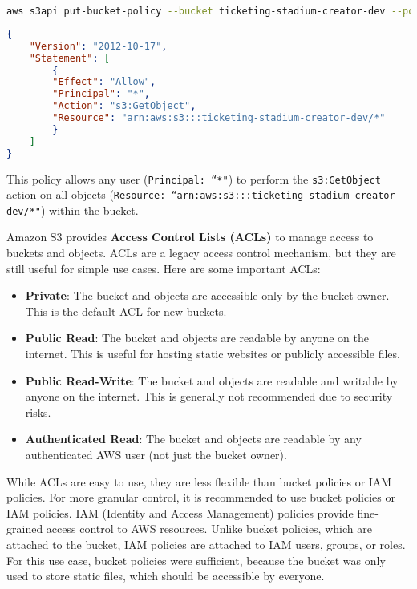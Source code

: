 \begin{lstlisting}[language=bash, caption={AWS CLI command to set a bucket policy}, label={lst:aws-cli-bucket-policy}]
aws s3api put-bucket-policy --bucket ticketing-stadium-creator-dev --policy file://bucket-policy.json
\end{lstlisting}

\begin{lstlisting}[language=json,caption=Bucket policy JSON configuration, label=lst:bucket-policy]
{
    "Version": "2012-10-17",
    "Statement": [
        {
        "Effect": "Allow",
        "Principal": "*",
        "Action": "s3:GetObject",
        "Resource": "arn:aws:s3:::ticketing-stadium-creator-dev/*"
        }
    ]
}
\end{lstlisting}

This policy allows any user (\texttt{Principal: ``*"}) to perform the \texttt{s3:GetObject} action on all objects (\texttt{Resource: ``arn:aws:s3:::ticketing-stadium-creator-dev/*"}) within the bucket.

Amazon S3 provides \textbf{Access Control Lists (ACLs)} to manage access to buckets and objects. ACLs are a legacy access control mechanism, but they are still useful for simple use cases. Here are some important ACLs:

\begin{itemize}
    \item \textbf{Private}: The bucket and objects are accessible only by the bucket owner. This is the default ACL for new buckets.
    \item \textbf{Public Read}: The bucket and objects are readable by anyone on the internet. This is useful for hosting static websites or publicly accessible files.
    \item \textbf{Public Read-Write}: The bucket and objects are readable and writable by anyone on the internet. This is generally not recommended due to security risks.
    \item \textbf{Authenticated Read}: The bucket and objects are readable by any authenticated AWS user (not just the bucket owner).
\end{itemize}

While ACLs are easy to use, they are less flexible than bucket policies or IAM policies. For more granular control, it is recommended to use bucket policies or IAM policies. IAM (Identity and Access Management) policies provide fine-grained access control to AWS resources. Unlike bucket policies, which are attached to the bucket, IAM policies are attached to IAM users, groups, or roles. For this use case, bucket policies were sufficient, because the bucket was only used to store static files, which should be accessible by everyone.